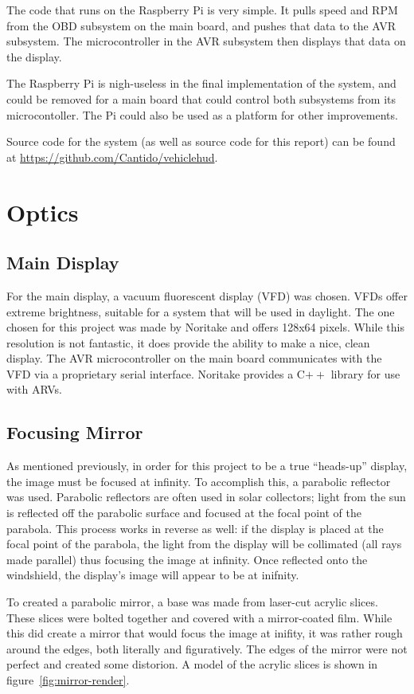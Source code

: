 The code that runs on the Raspberry Pi is very simple. It pulls speed and RPM
from the OBD subsystem on the main board, and pushes that data to the AVR
subsystem. The microcontroller in the AVR subsystem then displays that data
on the display.

The Raspberry Pi is nigh-useless in the final implementation of the system, and
could be removed for a main board that could control both subsystems from its
microcontoller. The Pi could also be used as a platform for other improvements.

Source code for the system (as well as source code for this report) can be
found at \url{https://github.com/Cantido/vehiclehud}.

\section{Optics}
\subsection{Main Display}
For the main display, a vacuum fluorescent display (VFD) was chosen.  VFDs offer
extreme brightness, suitable for a system that will be used in daylight.  The
one chosen for this project was made by Noritake and offers 128x64 pixels.  
While this resolution is not fantastic, it does provide the ability to make a
nice, clean display.  The AVR microcontroller on the main board communicates 
with the VFD via a proprietary serial interface.  Noritake provides a C$++$ 
library for use with ARVs.

\subsection{Focusing Mirror}
As mentioned previously, in order for this project to be a true ``heads-up'' 
display, the image must be focused at infinity.  To accomplish this, a 
parabolic reflector was used.  Parabolic reflectors are often used in solar
collectors; light from the sun is reflected off the parabolic surface and
focused at the focal point of the parabola.  This process works in reverse 
as well: if the display is placed at the focal point of the parabola, the
light from the display will be collimated (all rays made parallel) thus
focusing the image at infinity.  Once reflected onto the windshield, the
display's image will appear to be at inifnity.

To created a parabolic mirror, a base was made from laser-cut acrylic slices.
These slices were bolted together and covered with a mirror-coated film.  While
this did create a mirror that would focus the image at inifity, it was rather
rough around the edges, both literally and figuratively.  The edges of the mirror
were not perfect and created some distorion.  A model of the acrylic slices is 
shown in figure~\ref{fig:mirror-render}.

